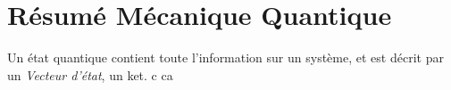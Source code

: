 \section*{Résumé Mécanique Quantique}
Un état quantique contient toute l'information sur un système, et est décrit par un
\textit{Vecteur d'état}, un ket. c ca
